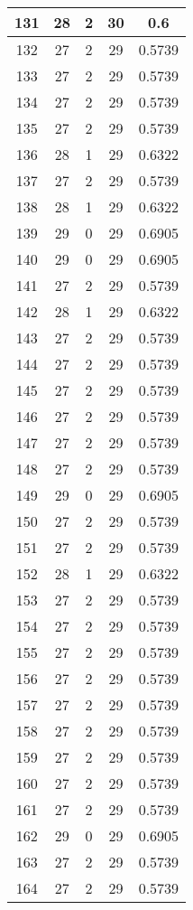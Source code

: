 \documentclass[letterpaper, 12pt]{article}
\begin{document}
\begin{longtable}{|c|c|c|c|c|}
\hline
131 & 28 & 2 & 30 & 0.6 \\
\hline
132 & 27 & 2 & 29 & 0.5739 \\
\hline
133 & 27 & 2 & 29 & 0.5739 \\
\hline
134 & 27 & 2 & 29 & 0.5739 \\
\hline
135 & 27 & 2 & 29 & 0.5739 \\
\hline
136 & 28 & 1 & 29 & 0.6322 \\
\hline
137 & 27 & 2 & 29 & 0.5739 \\
\hline
138 & 28 & 1 & 29 & 0.6322 \\
\hline
139 & 29 & 0 & 29 & 0.6905 \\
\hline
140 & 29 & 0 & 29 & 0.6905 \\
\hline
141 & 27 & 2 & 29 & 0.5739 \\
\hline
142 & 28 & 1 & 29 & 0.6322 \\
\hline
143 & 27 & 2 & 29 & 0.5739 \\
\hline
144 & 27 & 2 & 29 & 0.5739 \\
\hline
145 & 27 & 2 & 29 & 0.5739 \\
\hline
146 & 27 & 2 & 29 & 0.5739 \\
\hline
147 & 27 & 2 & 29 & 0.5739 \\
\hline
148 & 27 & 2 & 29 & 0.5739 \\
\hline
149 & 29 & 0 & 29 & 0.6905 \\
\hline
150 & 27 & 2 & 29 & 0.5739 \\
\hline
151 & 27 & 2 & 29 & 0.5739 \\
\hline
152 & 28 & 1 & 29 & 0.6322 \\
\hline
153 & 27 & 2 & 29 & 0.5739 \\
\hline
154 & 27 & 2 & 29 & 0.5739 \\
\hline
155 & 27 & 2 & 29 & 0.5739 \\
\hline
156 & 27 & 2 & 29 & 0.5739 \\
\hline
157 & 27 & 2 & 29 & 0.5739 \\
\hline
158 & 27 & 2 & 29 & 0.5739 \\
\hline
159 & 27 & 2 & 29 & 0.5739 \\
\hline
160 & 27 & 2 & 29 & 0.5739 \\
\hline
161 & 27 & 2 & 29 & 0.5739 \\
\hline
162 & 29 & 0 & 29 & 0.6905 \\
\hline
163 & 27 & 2 & 29 & 0.5739 \\
\hline
164 & 27 & 2 & 29 & 0.5739 \\

\end{longtable}
\end{document}
